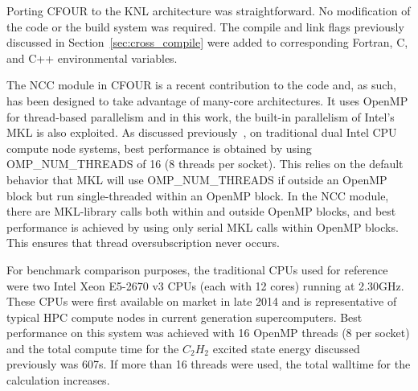 Porting CFOUR to the KNL architecture was straightforward. No modification of
the code or the build system was required. The compile and link flags
previously discussed in Section~\ref{sec:cross_compile} were added to
corresponding Fortran, C, and C++ environmental variables.

The NCC module in CFOUR is a recent contribution to the code and, as such, has
been designed to take advantage of many-core architectures. It uses OpenMP for
thread-based parallelism and in this work, the built-in parallelism of Intel's
MKL is also exploited. As discussed previously~\cite{ncc:15}, on traditional
dual Intel CPU compute node systems, best performance is obtained by using
OMP\_NUM\_THREADS of 16 (8 threads per socket). This relies on the default behavior that MKL will use
OMP\_NUM\_THREADS if outside an OpenMP block but run single-threaded within an
OpenMP block.  In the NCC module, there are MKL-library calls both within and
outside OpenMP blocks, and best performance is achieved by using only serial
MKL calls within OpenMP blocks. This ensures that thread oversubscription never
occurs.

For benchmark comparison purposes, the traditional CPUs used for reference were two Intel Xeon E5-2670 v3 CPUs
(each with 12 cores) running at 2.30GHz. These CPUs were first available on market in late 2014 and is
representative of typical HPC compute nodes in current generation supercomputers. Best performance on this
system was achieved with 16 OpenMP threads (8 per socket) and the total compute time for the $C_2H_2$ excited state energy
discussed previously was 607s.
If more than 16 threads were used, the total walltime for the calculation increases.

